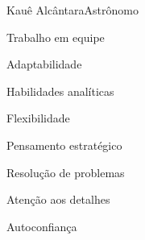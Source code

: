 \documentclass{article}
\begin{document}
\begin{cv}[fotocv]{Kauê Alcântara}{Astrônomo}
\begin{cvevent}[2021][2020]
\end{cvevent}

\vspace{15pt}

\begin{cvevent}[2020][2018]
\end{cvevent}

\cvsidebar %



\begin{cvitem}
    Trabalho em equipe
\end{cvitem}

\cvseparator
\begin{cvitem}
    Adaptabilidade
\end{cvitem}

\cvseparator
\begin{cvitem}
    Habilidades analíticas
\end{cvitem}

\cvseparator
\begin{cvitem}
    Flexibilidade
\end{cvitem}

\cvseparator
\begin{cvitem}
    Pensamento estratégico
\end{cvitem}

\cvseparator
\begin{cvitem}
    Resolução de problemas
\end{cvitem}

\cvseparator
\begin{cvitem}
    Atenção aos detalhes
\end{cvitem}

\cvseparator
\begin{cvitem}
    Autoconfiança
\end{cvitem}





\end{cv}
\end{document}

